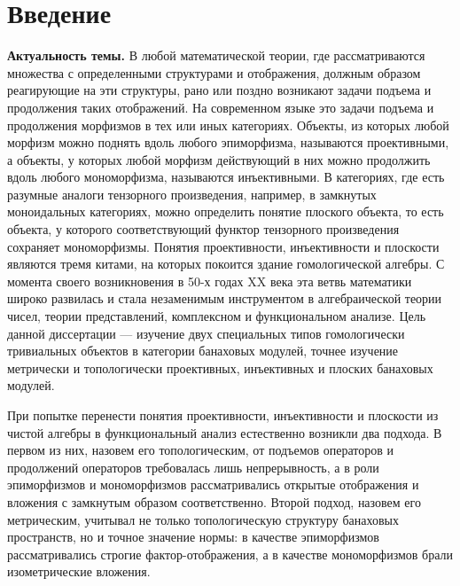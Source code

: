 \chapter*{Введение}							%

\textbf{Актуальность темы.} В любой математической теории, где рассматриваются множества с определенными структурами и отображения, должным образом реагирующие на эти структуры, рано или поздно возникают задачи подъема и продолжения таких отображений. На современном языке это задачи подъема и продолжения морфизмов в тех или иных категориях. Объекты, из которых любой морфизм можно поднять вдоль любого эпиморфизма, называются проективными, а объекты, у которых любой морфизм действующий в них можно продолжить вдоль любого мономорфизма, называются инъективными. В категориях, где есть разумные аналоги тензорного произведения, например, в замкнутых моноидальных категориях, можно определить понятие плоского объекта, то есть объекта, у которого соответствующий функтор тензорного произведения сохраняет мономорфизмы. Понятия проективности, инъективности и плоскости являются тремя китами, на которых покоится здание гомологической алгебры. С момента своего возникновения в 50-х годах XX века эта ветвь математики широко развилась и стала незаменимым инструментом в алгебраической теории чисел, теории представлений, комплексном и функциональном анализе. Цель данной диссертации --- изучение двух специальных типов гомологически тривиальных объектов в категории банаховых модулей, точнее изучение метрически и топологически проективных, инъективных и плоских банаховых модулей.

При попытке перенести понятия проективности, инъективности и плоскости из чистой алгебры в функциональный анализ естественно возникли два подхода. В первом из них, назовем его топологическим, от подъемов операторов и продолжений операторов требовалась лишь непрерывность, а в роли эпиморфизмов и мономорфизмов рассматривались открытые отображения и вложения с замкнутым образом соответственно. Второй подход, назовем его метрическим, учитывал не только топологическую структуру банаховых пространств, но и точное значение нормы: в качестве эпиморфизмов рассматривались строгие фактор-отображения, а в качестве мономорфизмов брали изометрические вложения. 

